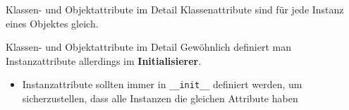 \begin{frame}[fragile]{Klassen- und Objektattribute im Detail}
	Klassenattribute sind für jede Instanz eines Objektes gleich.
	
\end{frame}

\begin{frame}[fragile]{Klassen- und Objektattribute im Detail}
	Gewöhnlich definiert man Instanzattribute allerdings im \textbf{Initialisierer}.
	 
	\begin{itemize}
		\item Instanzattribute sollten immer in \alert{\texttt{\_\_init\_\_}} definiert werden, um sicherzustellen, dass alle Instanzen die gleichen Attribute haben
	\end{itemize}
\end{frame}



